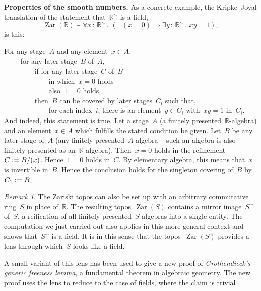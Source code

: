 \documentclass[oneside,reqno]{amsart}
\theoremstyle{definition}
\theoremstyle{plain}
\theoremstyle{remark}
\newtheorem{rem}[defn]{Remark}
\newenvironment{indentblock}{%
  \list{}{\leftmargin\leftmargin}%
  \item\relax
}{%
  \endlist
}
\newcommand{\RR}{\mathbb{R}}
\newcommand{\defeq}{\vcentcolon=}
\DeclareMathOperator{\Zar}{Zar}
\renewcommand{\_}{\mathpunct{.}\,}
\newcommand{\?}{\,{:}\,}
\renewcommand{\paragraph}[1]{\noindent\textbf{#1.}}
\begin{document}
\paragraph{Properties of the smooth numbers}
As a concrete example, the Kripke--Joyal translation of the statement that~$\RR^\sim$ is a field,
\[ \Zar(\RR) \models \forall x\?\RR^\sim\_ (\neg(x = 0) \Rightarrow \exists y\?\RR^\sim\_ xy = 1), \]
is this:
\begin{indentblock}
For any stage~$A$ and any element~$x \in A$, \\
${\qquad}$ for any later stage~$B$ of~$A$, \\
${\qquad\qquad}$ if for any later stage~$C$ of~$B$ \\
${\qquad\qquad\qquad}$ in which~$x = 0$ holds \\
${\qquad\qquad\qquad}$ also~$1 = 0$ holds, \\
${\qquad\qquad}$ then~$B$ can be covered by later stages~$C_i$ such that, \\
${\qquad\qquad\qquad}$ for each
index~$i$, there is an element~$y \in C_i$ with~$xy = 1$ in~$C_i$.
\end{indentblock}
And indeed, this statement is true. Let a stage~$A$ (a finitely
presented~$\RR$-algebra) and an element~$x \in A$ which fulfills the stated
condition be given. Let~$B$ be any later stage of~$A$ (any finitely
presented~$A$-algebra -- such an algebra is also finitely presented as
an~$\RR$-algebra). Then~$x = 0$ holds in the refinement~$C \defeq B/(x)$.
Hence~$1 = 0$ holds in~$C$. By elementary algebra, this means that~$x$ is
invertible in~$B$. Hence the conclusion holds for the singleton covering
of~$B$ by~$C_1 \defeq B$.

\begin{rem}The Zariski topos can also be set up with an arbitrary commutative
ring~$S$ in place of~$\RR$. The resulting topos~$\Zar(S)$ contains a mirror
image~$S^\sim$ of~$S$, a reification of all finitely presented~$S$-algebras into a
single entity. The computation we just carried out also applies in this
more general context and shows that~$S^\sim$ is a field. It is in this sense that the
topos~$\Zar(S)$ provides a lens through which~$S$ looks like a field.

A small variant of this lens has been used to give a new proof of
\emph{Grothendieck's generic freeness lemma}, a fundamental theorem in
algebraic geometry. The new proof uses the lens to reduce to the case
of fields, where the claim is trivial~\cite[Section~11.5]{blechschmidt:phd}.
\end{rem}
\end{document}
